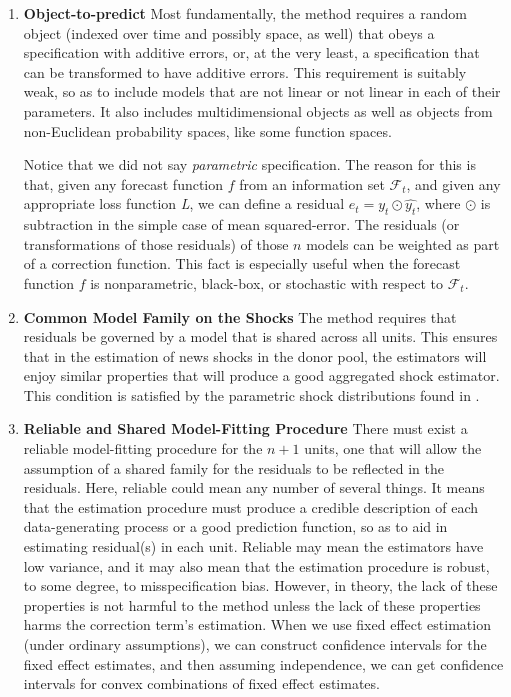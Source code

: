 \documentclass{uiucthesis2021}
\theoremstyle{definition}
\begin{document}
  \begin{enumerate}
    \item \textbf{Object-to-predict}
    Most fundamentally, the method requires a random object (indexed over time and possibly space, as well) that obeys a specification with additive errors, or, at the very least, a specification that can be transformed to have additive errors.  This requirement is suitably weak, so as to include models that are not linear or not linear in each of their parameters.  It also includes multidimensional objects as well as objects from non-Euclidean probability spaces, like some function spaces.  
  
  Notice that we did not say \textit{parametric} specification.  The reason for this is that, given any forecast function $f$ from an information set $\mathcal{F}_{t}$, and given any appropriate loss function \textit{L}, we can define a residual $e_{t} = y_{t} \odot \hat{y_{t}}$, where $\odot$ is subtraction in the simple case of mean squared-error.  The residuals (or transformations of those residuals) of those $n$ models can be weighted as part of a correction function.  This fact is especially useful when the forecast function $f$ is nonparametric, black-box, or stochastic with respect to $\mathcal{F}_{t}$.
  
  \item \textbf{Common Model Family on the Shocks} The method requires that residuals be governed by a model that is shared across all units.  This ensures that in the estimation of news shocks in the donor pool, the estimators will enjoy similar properties that will produce a good aggregated shock estimator.  This condition is satisfied by the parametric shock distributions found in \cite[][]{lin2021minimizing}\cite[][]{lundquist2024volatility}.
  
  \item \textbf{Reliable and Shared Model-Fitting Procedure} There must exist a reliable model-fitting procedure for the $n+1$ units, one that will allow the assumption of a shared family for the residuals to be reflected in the residuals.  Here, reliable could mean any number of several things.  It means that the estimation procedure must produce a credible description of each data-generating process or a good prediction function, so as to aid in estimating residual(s) in each unit.  Reliable may mean the estimators have low variance, and it may also mean that the estimation procedure is robust, to some degree, to misspecification bias.  However, in theory, the lack of these properties is not harmful to the method unless the lack of these properties harms the correction term's estimation.  When we use fixed effect estimation (under ordinary assumptions), we can construct confidence intervals for the fixed effect estimates, and then assuming independence, we can get confidence intervals for convex combinations of fixed effect estimates.
  

\end{enumerate}
\end{document}
